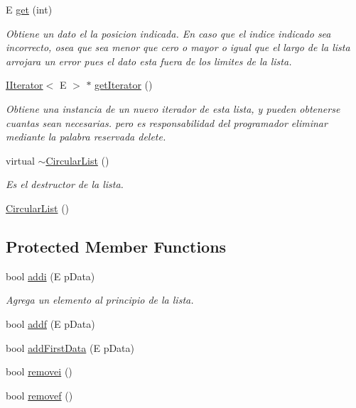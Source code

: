 \begin{DoxyCompactItemize}
E \hyperlink{class_circular_list_ad6783339c7ff05841fc62f74f809644d}{get} (int)
\begin{DoxyCompactList}\small\item\em Obtiene un dato el la posicion indicada. En caso que el indice indicado sea incorrecto, osea que sea menor que cero o mayor o igual que el largo de la lista arrojara un error pues el dato esta fuera de los limites de la lista. \end{DoxyCompactList}\item 
\hyperlink{class_i_iterator}{I\-Iterator}$<$ E $>$ $\ast$ \hyperlink{class_circular_list_a43e6cf1632001b3f409c6ce531529c6e}{get\-Iterator} ()
\begin{DoxyCompactList}\small\item\em Obtiene una instancia de un nuevo iterador de esta lista, y pueden obtenerse cuantas sean necesarias. pero es responsabilidad del programador eliminar mediante la palabra reservada delete. \end{DoxyCompactList}\item 
virtual \hyperlink{class_circular_list_aa65c9665b7d36a5e609752cad0a35dbb}{$\sim$\-Circular\-List} ()
\begin{DoxyCompactList}\small\item\em Es el destructor de la lista. \end{DoxyCompactList}\item 
\hyperlink{class_circular_list_aad23571a808ede6fc0432dca645ab2ca}{Circular\-List} ()
\end{DoxyCompactItemize}
\subsection*{Protected Member Functions}
\begin{DoxyCompactItemize}
\item 
bool \hyperlink{class_circular_list_a6f405f4be7946286a958e0b83937b3e2}{addi} (E p\-Data)
\begin{DoxyCompactList}\small\item\em Agrega un elemento al principio de la lista. \end{DoxyCompactList}\item 
bool \hyperlink{class_circular_list_ad2832eb48d7d69fa5d759c0c16c4bc5e}{addf} (E p\-Data)
\item 
bool \hyperlink{class_circular_list_a0a3f318454d748eff1e3b8729aea94bd}{add\-First\-Data} (E p\-Data)
\item 
bool \hyperlink{class_circular_list_a706dd0ab6fb475bec90d9c40cefa92b1}{removei} ()
\item 
bool \hyperlink{class_circular_list_a1dde06b77306b31eb38fa4b43b6009ab}{removef} ()
\end{DoxyCompactItemize}
